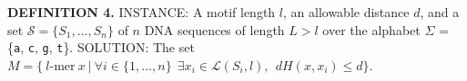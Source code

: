 \documentclass[oneside,12pt]{DISCSthesis}
\begin{document}
		\noindent\textbf{\boldmath DEFINITION 4.}
		\newline
		\noindent INSTANCE: A motif length $l$, an allowable distance $d$, and a set $\mathcal{S} = \{S_{1},..., S_{n}\}$\newline
		\noindent\hspace*{55pt}of $n$ DNA sequences of length $L > l$ over the alphabet $\Sigma$ = \{\texttt{a}, \texttt{c}, \texttt{g}, \texttt{t}\}.\newline
		\noindent SOLUTION: The set $M = \{\ l\text{-mer}\ x\ |\ \forall i \in \{1,...,n\}\ \ \exists x_i \in \mathcal{L}(S_i,l),\ \ dH(x, x_i) \leq d \}$.

\end{document}

